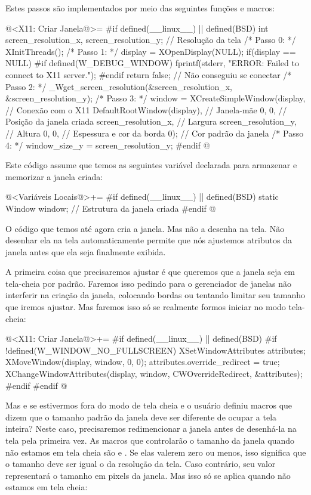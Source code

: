 Estes passos são implementados por meio das seguintes funções e
macros:

\iniciocodigo
@<X11: Criar Janela@>=
#if defined(__linux__) || defined(BSD)
int screen_resolution_x, screen_resolution_y; // Resolução da tela
/* Passo 0: */
XInitThreads();
/* Passo 1: */
display = XOpenDisplay(NULL);
if(display == NULL){
#if defined(W_DEBUG_WINDOW)
  fprintf(stderr, "ERROR: Failed to connect to X11 server.\n");
#endif
  return false; // Não conseguiu se conectar
}
/* Passo 2: */
_Wget_screen_resolution(&screen_resolution_x, &screen_resolution_y);
/* Passo 3: */
window = XCreateSimpleWindow(display, // Conexão com o X11
                             DefaultRootWindow(display), // Janela-mãe
                             0, 0, // Posição da janela criada
                             screen_resolution_x, // Largura
                             screen_resolution_y, // Altura
                             0, 0, // Espessura e cor da borda
                             0); // Cor padrão da janela
/* Passo 4: */
window_size_y =  screen_resolution_y;
#endif
@
\fimcodigo

Este código assume que temos as seguintes variável declarada para
armazenar e memorizar a janela criada:

\iniciocodigo
@<Variáveis Locais@>+=
#if defined(__linux__) || defined(BSD)
static Window window;    // Estrutura da janela criada
#endif
@
\fimcodigo

O código que temos até agora cria a janela. Mas não a desenha na
tela. Não desenhar ela na tela automaticamente permite que nós
ajustemos atributos da janela antes que ela seja finalmente exibida.

A primeira coisa que precisaremos ajustar é que queremos que a janela
seja em tela-cheia por padrão. Faremos isso pedindo para o gerenciador
de janelas não interferir na criação da janela, colocando bordas ou
tentando limitar seu tamanho que iremos ajustar. Mas faremos isso só
se realmente formos iniciar no modo tela-cheia:

\iniciocodigo
@<X11: Criar Janela@>+=
#if defined(__linux__) || defined(BSD)
#if !defined(W_WINDOW_NO_FULLSCREEN)
{
  XSetWindowAttributes attributes;
  XMoveWindow(display, window, 0, 0);
  attributes.override_redirect = true;
  XChangeWindowAttributes(display, window, CWOverrideRedirect,
                          &attributes);
}
#endif
#endif
@
\fimcodigo

Mas e se estivermos fora do modo de tela cheia e o usuário definiu
macros que dizem que o tamanho padrão da janela deve ser diferente de
ocupar a tela inteira? Neste caso, precisaremos redimencionar a janela
antes de desenhá-la na tela pela primeira vez. As macros que
controlarão o tamanho da janela quando não estamos em tela cheia
são 
e . Se elas valerem zero ou
menos, isso significa que o tamanho deve ser igual o da resolução da
tela. Caso contrário, seu valor representará o tamanho em pixels da
janela. Mas isso só se aplica quando não estamos em tela cheia:

